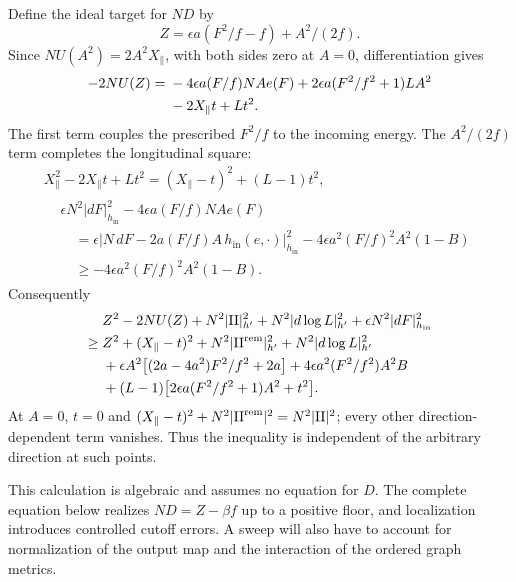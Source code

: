 Define the ideal target for \(ND\) by
\begin{equation}
 Z=\epsilon a(F^2/f-f)+A^2/(2f).
 \label{eq:graph-ideal-target}
\end{equation}
Since \(NU(A^2)=2A^2X_{\parallel}\), with both sides zero at \(A=0\),
differentiation gives
\begin{align}
 -2NU(Z)
 ={}&-4\epsilon a(F/f)NAe(F)
       +2\epsilon a(F^2/f^2+1)LA^2 \notag\\
    &-2X_{\parallel}t+Lt^2.
 \label{eq:graph-ideal-derivative}
\end{align}
The first term couples the prescribed \(F^2/f\) to the incoming
energy.  The \(A^2/(2f)\) term completes the longitudinal square:
\begin{equation}
 \begin{gathered}
 X_{\parallel}^2-2X_{\parallel}t+Lt^2
   =(X_{\parallel}-t)^2+(L-1)t^2,\\
 \begin{aligned}
 &\epsilon N^2|dF|_{h_{\mathrm{in}}}^2
       -4\epsilon a(F/f)NAe(F)\\
 &\quad=\epsilon\left|N\,dF
       -2a(F/f)A\,h_{\mathrm{in}}(e,\cdot)\right|_{h_{\mathrm{in}}}^2
       -4\epsilon a^2(F/f)^2A^2(1-B)\\
 &\quad\ge-4\epsilon a^2(F/f)^2A^2(1-B).
 \end{aligned}
 \end{gathered}
 \label{eq:graph-ideal-completions}
\end{equation}
Consequently
\begin{align}
 &Z^2-2NU(Z)+N^2|\mathrm{II}|_{h'}^2+N^2|d\log L|_{h'}^2
                 +\epsilon N^2|dF|_{h_{\mathrm{in}}}^2 \notag\\
 \ge{}&Z^2+(X_{\parallel}-t)^2+N^2|\mathrm{II}^{\mathrm{rem}}|_{h'}^2
                 +N^2|d\log L|_{h'}^2 \notag\\
 &+\epsilon A^2\bigl[(2a-4a^2)F^2/f^2+2a\bigr]
       +4\epsilon a^2(F^2/f^2)A^2B \notag\\
 &+(L-1)\bigl[2\epsilon a(F^2/f^2+1)A^2+t^2\bigr].
 \label{eq:graph-ideal-bound}
\end{align}
At \(A=0\), \(t=0\) and
\((X_{\parallel}-t)^2+N^2|\mathrm{II}^{\mathrm{rem}}|^2=N^2|\mathrm{II}|^2\); every other
direction-dependent term vanishes.  Thus the inequality is independent
of the arbitrary direction at such points.

This calculation is algebraic and assumes no equation for \(D\).
The complete equation below realizes \(ND=Z-\beta f\) up to a positive
floor, and localization introduces controlled cutoff errors.  A sweep
will also have to account for normalization of the output map and the
interaction of the ordered graph metrics.

